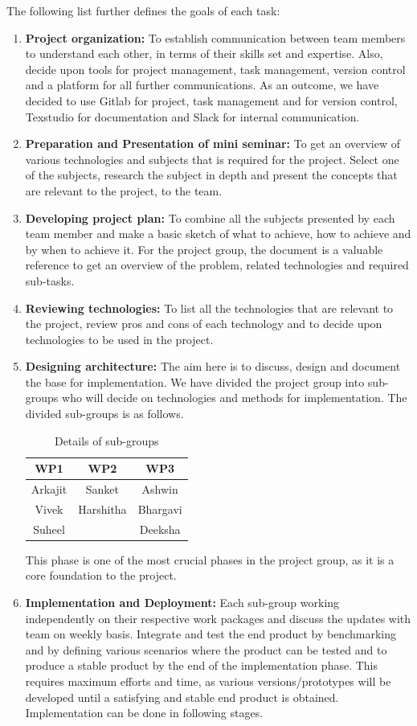 The following list further defines the goals of each task: 
\begin{enumerate}
	\item \textbf{Project organization:}
	To establish communication between team members to understand each other, in terms of their skills set and expertise. Also, decide upon tools for project management, task management, version control and a platform for all further communications. As an outcome, we have decided to use Gitlab for project, task management and for version control, Texstudio for documentation and Slack for internal communication.
	\item \textbf{Preparation and Presentation of mini seminar:}
	To get an overview of various technologies and subjects that is required for the project. Select one of the subjects, research the subject in depth and present the concepts that are relevant to the project, to the team.
	\item \textbf{Developing project plan:}
	To combine all the subjects presented by each team member and make a basic sketch of what to achieve, how to achieve and by when to achieve it. For the project group, the document is a valuable reference to get an overview of the problem, related technologies and required sub-tasks. 
	\item \textbf{Reviewing technologies:}
	To list all the technologies that are relevant to the project, review pros and cons of each technology and to decide upon technologies to be used in the project.
	\item \textbf{Designing architecture:}
 The aim here is to discuss, design and document the base for implementation. 	We have divided the project group into sub-groups who will decide on technologies and methods for implementation. The divided sub-groups is as follows.
 
\begin{table} [h]
	\centering
	\begin{tabular}{|c|c|c|}
		\hline
		WP1 & WP2 & WP3 \\
		\hline
		Arkajit & Sanket & Ashwin \\
		\hline
		Vivek &	Harshitha & Bhargavi \\
		\hline
		Suheel &  & Deeksha \\
		\hline
	\end{tabular}
	\caption{Details of sub-groups}
\end{table}
	
	This phase is one of the most crucial phases in the project group, as it is a core foundation to the project.
	\item \textbf{Implementation and Deployment:}
	 Each sub-group working independently on their respective work packages and discuss the updates with team on weekly basis. Integrate and test the end product by benchmarking and by defining various scenarios where the product can be tested and to produce a stable product by the end of the implementation phase. This requires maximum efforts and time, as various versions/prototypes will be developed until a satisfying and stable end product is obtained. Implementation can be done in following stages.
	

\end{enumerate}
